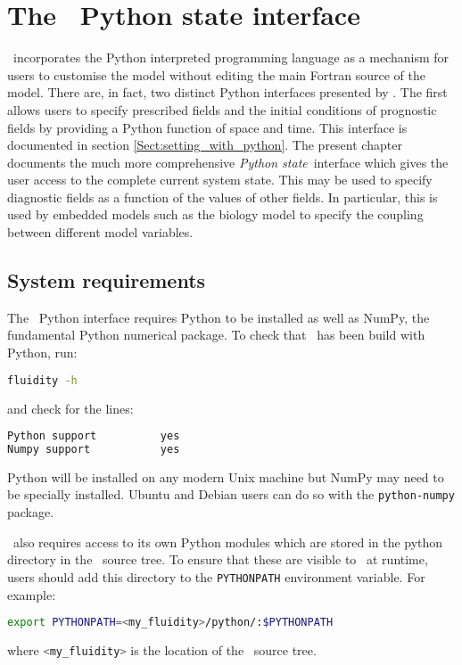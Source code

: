 \chapter{The \fluidity\ Python state interface}\label{chap:python}

\fluidity\ incorporates the Python interpreted programming language as a
mechanism for users to customise the model without editing the main Fortran
source of the model. There are, in fact, two distinct Python interfaces
presented by \fluidity. The first allows users to specify prescribed fields
and the initial conditions of prognostic fields by providing a Python
function of space and time. This interface is documented in section
\ref{Sect:setting_with_python}. The present chapter documents the much more
comprehensive \emph{Python state}\ interface which gives the user access to
the complete current system state. This may be used to specify diagnostic
fields as a function of the values of other fields. In particular, this is
used by embedded models such as the biology model to specify the coupling
between different model variables.

\section{System requirements}

The \fluidity\ Python interface requires Python to be installed as well as
NumPy, the fundamental Python numerical package. To check that \fluidity\
has been build with Python, run:
\begin{lstlisting}[language=Bash]
  fluidity -h
\end{lstlisting}
and check for the lines:
\begin{lstlisting}[language=Bash]
Python support			yes
Numpy support			yes
\end{lstlisting}
Python will be installed on any modern Unix machine but NumPy may need to be
specially installed. Ubuntu and Debian users can do so with the
\lstinline[language=Bash]+python-numpy+ package.

\fluidity\ also requires access to its own Python modules which are stored in
the python directory in the \fluidity\ source tree. To ensure that these are
visible to \fluidity\ at runtime, users should add this directory to the
\lstinline[language=Bash]+PYTHONPATH+ environment variable. For example:\
\begin{lstlisting}[language=Bash]
export PYTHONPATH=<my_fluidity>/python/:$PYTHONPATH
\end{lstlisting}%
where \lstinline[language=Bash]+<my_fluidity>+ is the location of the
\fluidity\ source tree.

